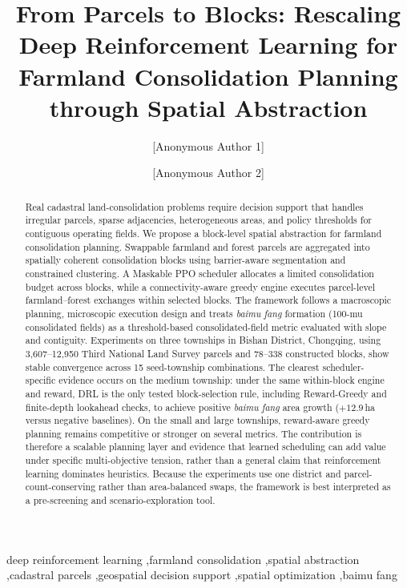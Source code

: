 \documentclass[preprint,12pt]{elsarticle}
\begin{document}
\begin{frontmatter}

\title{From Parcels to Blocks: Rescaling Deep Reinforcement Learning for Farmland Consolidation Planning through Spatial Abstraction}

\author[anon]{[Anonymous Author 1]}
\author[anon]{[Anonymous Author 2]}


\begin{abstract}
Real cadastral land-consolidation problems require decision support that handles irregular parcels, sparse adjacencies, heterogeneous areas, and policy thresholds for contiguous operating fields. We propose a block-level spatial abstraction for farmland consolidation planning. Swappable farmland and forest parcels are aggregated into spatially coherent consolidation blocks using barrier-aware segmentation and constrained clustering. A Maskable PPO scheduler allocates a limited consolidation budget across blocks, while a connectivity-aware greedy engine executes parcel-level farmland--forest exchanges within selected blocks. The framework follows a macroscopic planning, microscopic execution design and treats \textit{baimu fang} formation (100-mu consolidated fields) as a threshold-based consolidated-field metric evaluated with slope and contiguity. Experiments on three townships in Bishan District, Chongqing, using 3,607--12,950 Third National Land Survey parcels and 78--338 constructed blocks, show stable convergence across 15 seed-township combinations. The clearest scheduler-specific evidence occurs on the medium township: under the same within-block engine and reward, DRL is the only tested block-selection rule, including Reward-Greedy and finite-depth lookahead checks, to achieve positive \textit{baimu fang} area growth ($+12.9$\,ha versus negative baselines). On the small and large townships, reward-aware greedy planning remains competitive or stronger on several metrics. The contribution is therefore a scalable planning layer and evidence that learned scheduling can add value under specific multi-objective tension, rather than a general claim that reinforcement learning dominates heuristics. Because the experiments use one district and parcel-count-conserving rather than area-balanced swaps, the framework is best interpreted as a pre-screening and scenario-exploration tool.
\end{abstract}

\begin{keyword}
deep reinforcement learning \sep farmland consolidation \sep spatial abstraction \sep cadastral parcels \sep geospatial decision support \sep spatial optimization \sep baimu fang
\end{keyword}

\end{frontmatter}
\end{document}
